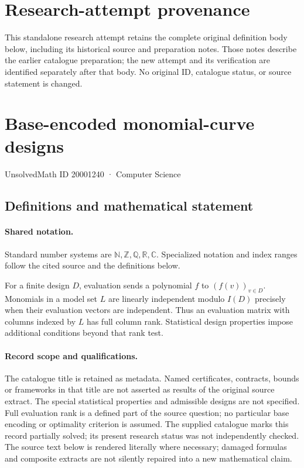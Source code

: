 \documentclass[11pt]{article}
\begin{document}
\section*{Research-attempt provenance}
This standalone research attempt retains the complete original definition body below,
including its historical source and preparation notes. Those notes describe the
earlier catalogue preparation; the new attempt and its verification are identified
separately after that body. No original ID, catalogue status, or source statement is changed.

\section{Base-encoded monomial-curve designs}\label{20001240}
{\small UnsolvedMath ID 20001240 · Computer Science}
\subsection{Definitions and mathematical statement}

\paragraph{Shared notation.}Standard number systems are $\mathbb N,\mathbb Z,\mathbb Q,\mathbb R,\mathbb C$. Specialized notation and index ranges follow the cited source and the definitions below.


For a finite design $D$, evaluation sends a polynomial $f$ to $(f(v))_{v\in D}$. Monomials in a model set $L$ are linearly independent modulo $I(D)$ precisely when their evaluation vectors are independent. Thus an evaluation matrix with columns indexed by $L$ has full column rank. Statistical design properties impose additional conditions beyond that rank test.
\paragraph{Record scope and qualifications.}
The catalogue title is retained as metadata. Named certificates, contracts, bounds or frameworks in that title are not asserted as results of the original source extract.
The special statistical properties and admissible designs are not specified. Full evaluation rank is a defined part of the source question; no particular base encoding or optimality criterion is assumed. The supplied catalogue marks this record partially solved; its present research status was not independently checked.
The source text below is rendered literally where necessary; damaged formulas and composite extracts are not silently repaired into a new mathematical claim.
\end{document}
